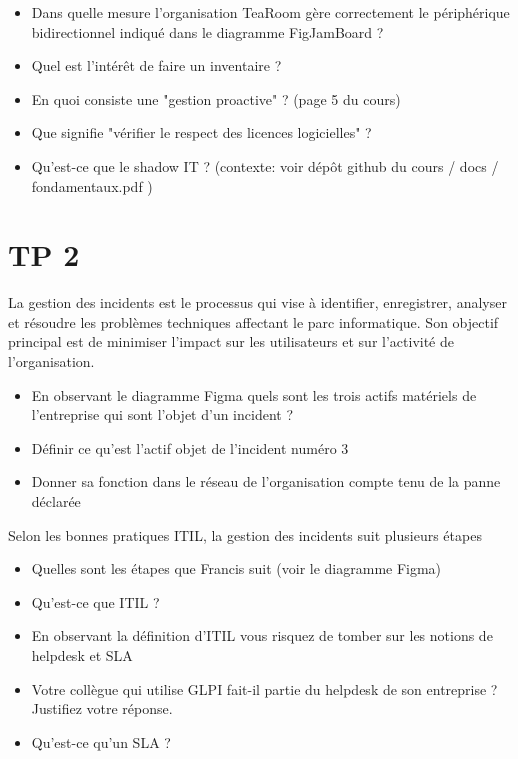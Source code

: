 \documentclass[12pt, letterpaper]{article}
\begin{document}
\begin{itemize}
    \item Dans quelle mesure l'organisation TeaRoom gère correctement le périphérique bidirectionnel indiqué dans le diagramme FigJamBoard ?
\end{itemize}


\begin{itemize}
    \item Quel est l'intérêt de faire un inventaire ?
    \item En quoi consiste une "gestion proactive" ? (page 5 du cours)
    \item Que signifie "vérifier le respect des licences logicielles" ?
    \item Qu'est-ce que le shadow IT ? (contexte: voir dépôt github du cours / docs / fondamentaux.pdf )
\end{itemize}


\section*{TP 2}

\begin{tcolorbox}[colback=cyan!5,colframe=cyan!60!black,title=Définition]
La gestion des incidents est le processus qui vise à identifier, enregistrer, analyser et résoudre les problèmes techniques affectant le parc informatique. Son objectif principal est de minimiser l’impact sur les utilisateurs et sur l’activité de l’organisation.
\end{tcolorbox}

\begin{itemize}
    \item En observant le diagramme Figma quels sont les trois actifs matériels de l'entreprise qui sont l'objet d'un incident ?
    \item Définir ce qu'est l'actif objet de l'incident numéro 3
    \item Donner sa fonction dans le réseau de l'organisation compte tenu de la panne déclarée
\end{itemize}

\begin{tcolorbox}[colback=cyan!5,colframe=cyan!60!black,title=ITIL]
Selon les bonnes pratiques ITIL, la gestion des incidents suit plusieurs étapes 
\end{tcolorbox}

\begin{itemize}
    \item Quelles sont les étapes que Francis suit (voir le diagramme Figma)
    \item Qu'est-ce que ITIL ?
    \item En observant la définition d'ITIL vous risquez de tomber sur les notions de helpdesk et SLA
    \item Votre collègue qui utilise GLPI fait-il partie du helpdesk de son entreprise ? Justifiez votre réponse.
    \item Qu'est-ce qu'un SLA ?
\end{itemize}
\end{document}
